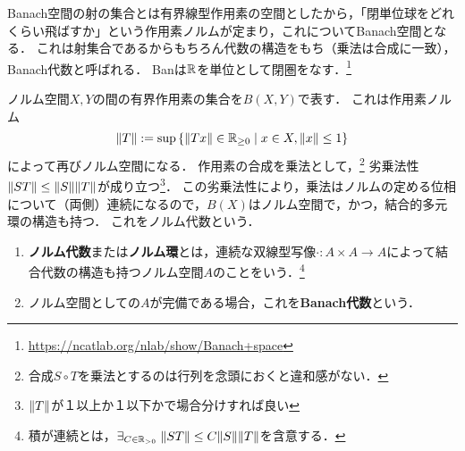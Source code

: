 \documentclass[uplatex,dvipdfmx]{jsreport}
\begin{document}
\begin{tcolorbox}[colframe=ForestGreen, colback=ForestGreen!10!white,breakable,colbacktitle=ForestGreen!40!white,coltitle=black,fonttitle=\bfseries\sffamily,
title=Banには内部homを持つ閉圏としての構造がある]
    Banach空間の射の集合とは有界線型作用素の空間としたから，「閉単位球をどれくらい飛ばすか」という作用素ノルムが定まり，これについてBanach空間となる．
    これは射集合であるからもちろん代数の構造をもち（乗法は合成に一致），Banach代数と呼ばれる．
    Banは$\mathbb{R}$を単位として閉圏をなす．\footnote{\url{https://ncatlab.org/nlab/show/Banach+space}}
\end{tcolorbox}

\begin{definition}
    ノルム空間$X,Y$の間の有界作用素の集合を$B(X,Y)$で表す．
    これは作用素ノルム\[\|T\|:=\sup\left\{\|Tx\|\in\mathbb{R}_{\ge 0}\mid x\in X,\|x\|\le 1\right\}\]によって再びノルム空間になる．
    作用素の合成を乗法として，\footnote{合成$S\circ T$を乗法とするのは行列を念頭におくと違和感がない．}
    劣乗法性$\|ST\|\le\|S\|\|T\|$が成り立つ\footnote{$\|T\|$が１以上か１以下かで場合分けすれば良い}．
    この劣乗法性により，乗法はノルムの定める位相について（両側）連続になるので，$B(X)$はノルム空間で，かつ，結合的多元環の構造も持つ．
    これをノルム代数という．
\end{definition}

\begin{definition}\mbox{}
    \begin{enumerate}
        \item \textbf{ノルム代数}または\textbf{ノルム環}とは，連続な双線型写像$\cdot :A\times A\to A$によって結合代数の構造も持つノルム空間$A$のことをいう．\footnote{積が連続とは，$\exists_{C\in\mathbb{R}_{>0}}\;\|ST\|\le C\|S\|\|T\|$を含意する．}
        \item ノルム空間としての$A$が完備である場合，これを\textbf{Banach代数}という．
    \end{enumerate}
\end{definition}
\end{document}
